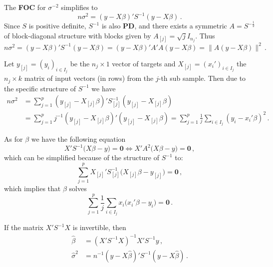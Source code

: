 \documentclass[a4paper,12pt]{extarticle}
\begin{document}
The \textbf{FOC} for $\sigma^{-2}$ simplifies to
$$ n \sigma^2 = (y-X\beta)'S^{-1}(y-X\beta) \,. $$
Since $S$ is positive definite, $S^{-1}$ is also \textbf{PD}, and there exists a symmetric
$A = S^{-\frac{1}{2}}$ of block-diagonal structure with blocks given by $A_{[j]} = \sqrt{j} I_{n_j}$.
Thus 
$$ n \sigma^2
  = (y-X\beta)'S^{-1}(y-X\beta)
  = (y-X\beta)'A' A(y-X\beta)
  = \|A(y-X\beta)\|^2 \,. $$

Let $y_{[j]} = (y_i)_{i\in I_j}$ be the $n_j \times 1$ vector of targets and
$X_{[j]} = (x_i')_{i\in I_j}$ the $n_j\times k$ matrix of input vectors (in rows)
from the $j$-th sub sample. Then due to the specific structure of $S^{-1}$ we have
\begin{align*}
  n \sigma^2
    &= \sum_{j=1}^p (y_{[j]} - X_{[j]}\beta)' S^{-1}_{[j]} (y_{[j]} - X_{[j]}\beta) \\
    &= \sum_{j=1}^p j^{-1} (y_{[j]} - X_{[j]}\beta)' (y_{[j]} - X_{[j]}\beta) 
      = \sum_{j=1}^p \frac{1}{j} \sum_{i\in I_j} (y_i - x_i'\beta)^2 \,.
\end{align*}

As for $\beta$ we have the following equation
$$ X'S^{-1}\bigl(X \beta - y \bigr) = \mathbf{0}
  \Leftrightarrow X'A^2\bigl(X \beta - y \bigr) = \mathbf{0} \,,$$
which can be simplified because of the structure of $S^{-1}$ to:
$$ \sum_{j=1}^p X_{[j]}'S^{-1}_{[j]}\bigl(X_{[j]} \beta - y_{[j]}\bigr) = \mathbf{0} \,,$$
which implies that $\beta$ solves
$$ \sum_{j=1}^p\frac{1}{j} \sum_{i\in I_j} x_i\bigl(x_i' \beta - y_i\bigr) = \mathbf{0} \,.$$

If the matrix $X'S^{-1}X$ is invertible, then
\begin{align*}
  \hat{\beta} &= (X'S^{-1}X)^{-1}X'S^{-1}y\,,\\
  \hat{\sigma}^2 &= n^{-1} (y-X\hat{\beta})'S^{-1}(y-X\hat{\beta})\,.
\end{align*}
\end{document}

